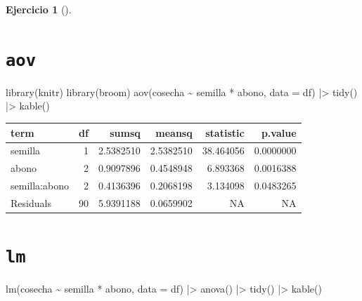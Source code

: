 \documentclass[
  a4paper,
]{scrreport}
\newenvironment{Shaded}{\begin{snugshade}}{\end{snugshade}}
\newcommand{\AttributeTok}[1]{\textcolor[rgb]{0.40,0.45,0.13}{#1}}
\newcommand{\FunctionTok}[1]{\textcolor[rgb]{0.28,0.35,0.67}{#1}}
\newcommand{\NormalTok}[1]{\textcolor[rgb]{0.00,0.23,0.31}{#1}}
\newcommand{\SpecialCharTok}[1]{\textcolor[rgb]{0.37,0.37,0.37}{#1}}
\theoremstyle{definition}
\newtheorem{exercise}{Ejercicio}[chapter]
\theoremstyle{remark}
\begin{document}
\begin{exercise}[]
\begin{enumerate}
\begin{tcolorbox}
  \section{\texorpdfstring{\texttt{aov}}{aov}}

\begin{Shaded}
\begin{Highlighting}[]
\FunctionTok{library}\NormalTok{(knitr)}
\FunctionTok{library}\NormalTok{(broom)}
\FunctionTok{aov}\NormalTok{(cosecha }\SpecialCharTok{\textasciitilde{}}\NormalTok{ semilla }\SpecialCharTok{*}\NormalTok{ abono, }\AttributeTok{data =}\NormalTok{ df) }\SpecialCharTok{|\textgreater{}} 
    \FunctionTok{tidy}\NormalTok{() }\SpecialCharTok{|\textgreater{}} 
    \FunctionTok{kable}\NormalTok{()}
\end{Highlighting}
\end{Shaded}

  \begin{longtable}[]{@{}lrrrrr@{}}
  \toprule\noalign{}
  term & df & sumsq & meansq & statistic & p.value \\
  \midrule\noalign{}
  \endhead
  \bottomrule\noalign{}
  \endlastfoot
  semilla & 1 & 2.5382510 & 2.5382510 & 38.464056 & 0.0000000 \\
  abono & 2 & 0.9097896 & 0.4548948 & 6.893368 & 0.0016388 \\
  semilla:abono & 2 & 0.4136396 & 0.2068198 & 3.134098 & 0.0483265 \\
  Residuals & 90 & 5.9391188 & 0.0659902 & NA & NA \\
  \end{longtable}

  \section{\texorpdfstring{\texttt{lm}}{lm}}

\begin{Shaded}
\begin{Highlighting}[]
\FunctionTok{lm}\NormalTok{(cosecha }\SpecialCharTok{\textasciitilde{}}\NormalTok{ semilla }\SpecialCharTok{*}\NormalTok{ abono, }\AttributeTok{data =}\NormalTok{ df) }\SpecialCharTok{|\textgreater{}} 
    \FunctionTok{anova}\NormalTok{() }\SpecialCharTok{|\textgreater{}} 
    \FunctionTok{tidy}\NormalTok{() }\SpecialCharTok{|\textgreater{}} 
    \FunctionTok{kable}\NormalTok{()}
\end{Highlighting}
\end{Shaded}


\end{tcolorbox}
\end{enumerate}
\end{exercise}
\end{document}

